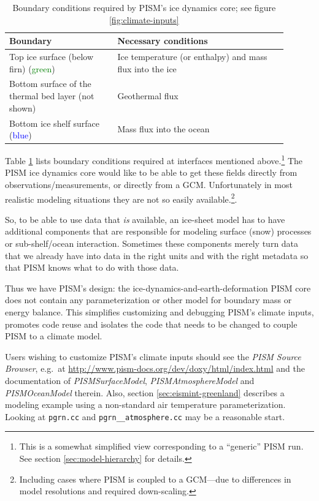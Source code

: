 \documentclass[11pt,final]{amsart}
\newcommand{\und}{\_\!\_}
\begin{document}
\begin{table}[h]
  \centering
  \begin{tabular}{p{0.35\linewidth}p{0.55\linewidth}}\\
    \hline
    \textbf{Boundary} & \textbf{Necessary conditions}\\
    \hline
    Top ice surface (below firn) (\textcolor{green}{green})& Ice temperature (or enthalpy) and mass flux into the ice\\
    Bottom surface of the thermal bed layer (not shown) & Geothermal flux\\
    Bottom ice shelf surface (\textcolor{blue}{blue})& Mass flux into the ocean\\
   \hline
  \end{tabular}
  \caption{Boundary conditions required by PISM's ice dynamics core; see figure
  \ref{fig:climate-inputs}}
  \label{tab:ice-dynamics-bc}
\end{table}

Table \ref{tab:ice-dynamics-bc} lists boundary conditions required at
interfaces mentioned above.\footnote{This is a somewhat simplified view  corresponding to a ``generic'' PISM run.   See section \ref{sec:model-hierarchy} for details.}  The PISM ice dynamics core would like to be able to get these fields directly from observations/measurements, or directly from a GCM.  Unfortunately in most realistic modeling situations they are not so easily available.\footnote{Including cases where PISM is coupled to a GCM---due to differences in model resolutions and required down-scaling.}.

So, to be able to use data that \emph{is} available, an ice-sheet model has to
have additional components that are responsible for modeling surface (snow)
processes or sub-shelf/ocean interaction.  Sometimes these components merely turn data that we already have into data in the right units and with the right metadata so that PISM knows what to do with those data.

Thus we have PISM's design: the ice-dynamics-and-earth-deformation PISM
core does not contain any parameterization or other model for boundary mass or
energy balance.  This simplifies customizing and debugging PISM's climate
inputs, promotes code reuse and isolates the code that needs to be changed to
couple PISM to a climate model.

Users wishing to customize PISM's climate inputs should see the \emph{PISM
  Source Browser}, e.g.~at
\url{http://www.pism-docs.org/dev/doxy/html/index.html} and the documentation
of \emph{PISMSurfaceModel}, \emph{PISMAtmosphereModel} and
\emph{PISMOceanModel} therein.  Also, section \ref{sec:eismint-greenland} describes a
modeling example using a non-standard air temperature parameterization. Looking
at \texttt{pgrn.cc} and \texttt{pgrn\und atmosphere.cc} may be a reasonable
start.
\end{document}
